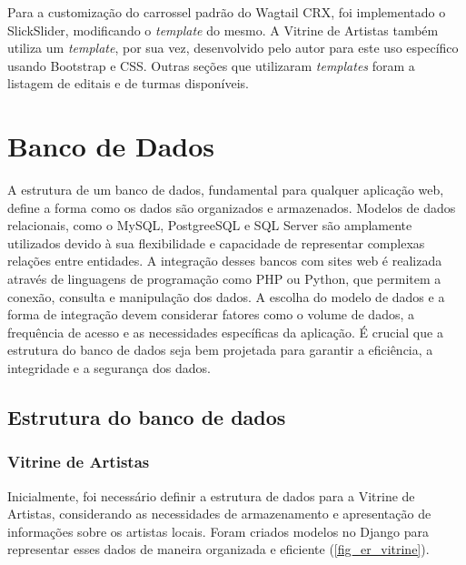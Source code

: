 Para a customização do carrossel padrão do Wagtail CRX, foi implementado o SlickSlider, modificando o \textit{template} do mesmo. A Vitrine de Artistas também utiliza um \textit{template}, por sua vez, desenvolvido pelo autor para este uso específico usando Bootstrap e \ac{CSS}. Outras seções que utilizaram \textit{templates} foram a listagem de editais e de turmas disponíveis.

\section{Banco de Dados}

A estrutura de um banco de dados, fundamental para qualquer aplicação web, define a forma como os dados são organizados e armazenados. Modelos de dados relacionais, como o MySQL, PostgreeSQL e SQL Server são amplamente utilizados devido à sua flexibilidade e capacidade de representar complexas relações entre entidades. A integração desses bancos com sites web é realizada através de linguagens de programação como PHP ou Python, que permitem a conexão, consulta e manipulação dos dados. A escolha do modelo de dados e a forma de integração devem considerar fatores como o volume de dados, a frequência de acesso e as necessidades específicas da aplicação. É crucial que a estrutura do banco de dados seja bem projetada para garantir a eficiência, a integridade e a segurança dos dados.

\subsection{Estrutura do banco de dados}

\subsubsection{Vitrine de Artistas}

Inicialmente, foi necessário definir a estrutura de dados para a Vitrine de Artistas, considerando as necessidades de armazenamento e apresentação de informações sobre os artistas locais. Foram criados modelos no Django para representar esses dados de maneira organizada e eficiente (\autoref{fig_er_vitrine}). 

